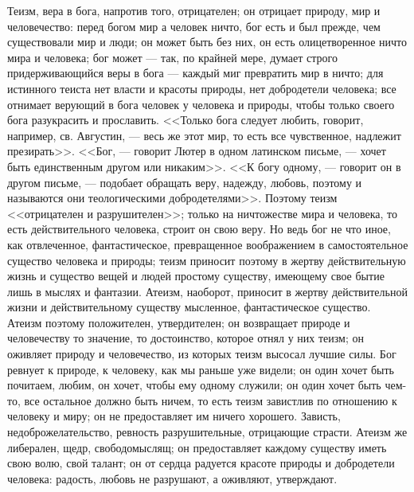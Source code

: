\documentclass[12pt]{article}
\begin{document}
Теизм, вера в бога, напротив того, отрицателен; он отрицает природу, мир и человечество: перед богом мир а человек ничто, бог есть и был прежде, чем существовали мир и люди; он может быть без них, он есть олицетворенное ничто мира и человека; бог может --- так, по крайней мере, думает строго придерживающийся веры в бога --- каждый миг превратить мир в ничто; для истинного теиста нет власти и красоты природы, нет добродетели человека; все отнимает верующий в бога человек у человека и природы, чтобы только своего бога разукрасить и прославить. <<Только бога следует любить, говорит, например, св. Августин, --- весь же этот мир, то есть все чувственное, надлежит презирать>>. <<Бог, --- говорит Лютер в одном латинском письме, --- хочет быть единственным другом или никаким>>. <<К богу одному, --- говорит он в другом письме, --- подобает обращать веру, надежду, любовь, поэтому и называются они теологическими добродетелями>>. Поэтому теизм <<отрицателен и разрушителен>>; только на ничтожестве мира и человека, то есть действительного человека, строит он свою веру. Но ведь бог не что иное, как отвлеченное, фантастическое, превращенное воображением в самостоятельное существо человека и природы; теизм приносит поэтому в жертву действительную жизнь и существо вещей и людей простому существу, имеющему свое бытие лишь в мыслях и фантазии. Атеизм, наоборот, приносит в жертву действительной жизни и действительному существу мысленное, фантастическое существо. Атеизм поэтому положителен, утвердителен; он возвращает природе и человечеству то значение, то достоинство, которое отнял у них теизм; он оживляет природу и человечество, из которых теизм высосал лучшие силы. Бог ревнует к природе, к человеку, как мы раньше уже видели; он один хочет быть почитаем, любим, он хочет, чтобы ему одному служили; он один хочет быть чем-то, все остальное должно быть ничем, то есть теизм завистлив по отношению к человеку и миру; он не предоставляет им ничего хорошего. Зависть, недоброжелательство, ревность разрушительные, отрицающие страсти. Атеизм же либерален, щедр, свободомыслящ; он предоставляет каждому существу иметь свою волю, свой талант; он от сердца радуется красоте природы и добродетели человека: радость, любовь не разрушают, а оживляют, утверждают. 
\end{document}

